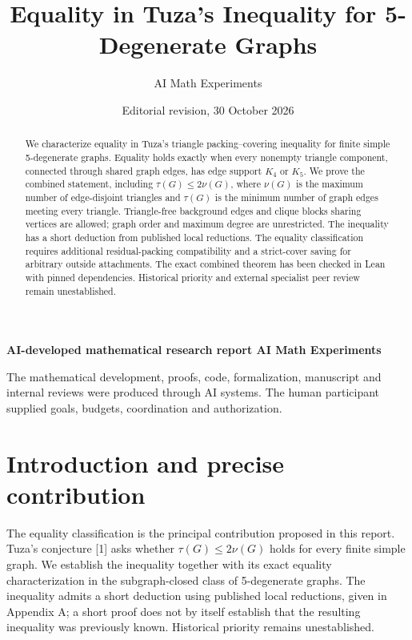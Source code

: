 \documentclass[11pt]{article}
\title{Equality in Tuza's Inequality for 5-Degenerate Graphs}
\author{AI Math Experiments}
\date{Editorial revision, 30 October 2026}
\begin{document}
\maketitle
\begin{center}\small\textbf{AI-developed mathematical research report \textemdash{} AI Math Experiments}\end{center}
\noindent\small The mathematical development, proofs, code, formalization, manuscript and internal reviews were produced through AI systems. The human participant supplied goals, budgets, coordination and authorization.\par\normalsize
\begin{abstract}
We characterize equality in Tuza's triangle packing--covering inequality
for finite simple 5-degenerate graphs. Equality holds exactly when every
nonempty triangle component, connected through shared graph edges, has
edge support \(K_4\) or \(K_5\). We prove the combined statement,
including \(\tau(G)\le2\nu(G)\), where \(\nu(G)\) is the maximum number
of edge-disjoint triangles and \(\tau(G)\) is the minimum number of
graph edges meeting every triangle. Triangle-free background edges and
clique blocks sharing vertices are allowed; graph order and maximum
degree are unrestricted. The inequality has a short deduction from
published local reductions. The equality classification requires
additional residual-packing compatibility and a strict-cover saving for
arbitrary outside attachments. The exact combined theorem has been
checked in Lean with pinned dependencies. Historical priority and
external specialist peer review remain unestablished.

\end{abstract}
\section{Introduction and precise
contribution}\label{introduction-and-precise-contribution}

The equality classification is the principal contribution proposed in
this report. Tuza's conjecture {[}1{]} asks whether
\(\tau(G)\le2\nu(G)\) holds for every finite simple graph. We establish
the inequality together with its exact equality characterization in the
subgraph-closed class of 5-degenerate graphs. The inequality admits a
short deduction using published local reductions, given in Appendix A; a
short proof does not by itself establish that the resulting inequality
was previously known. Historical priority remains unestablished.
\end{document}
